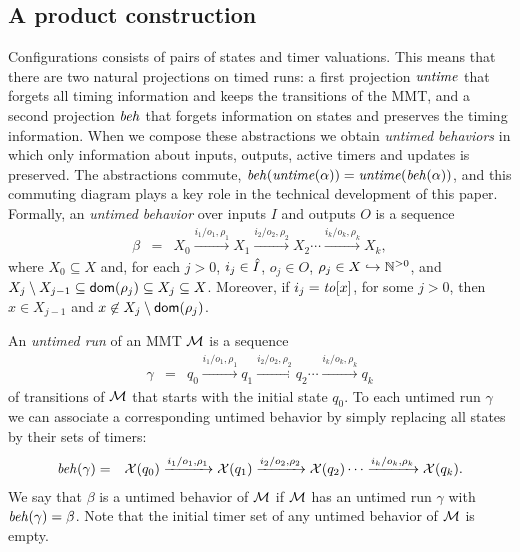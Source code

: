 \subsection{A product construction}
Configurations consists of pairs of states and timer valuations. This means that there are two natural projections on
timed runs: a first projection $\mathit{untime}$ that forgets all timing information and keeps the transitions of the MMT, 
and a second projection $\mathit{beh}$ that forgets information on states and preserves the timing information.
When we compose these abstractions we obtain \emph{untimed behaviors} in which only information about inputs, outputs,
active timers and updates is preserved.
The abstractions commute, $\mathit{beh}(\mathit{untime}(\alpha))=\mathit{untime}(\mathit{beh}(\alpha))$, and this commuting diagram plays a key role in
the technical development of this paper.
%
Formally, an \emph{untimed behavior} over inputs $I$ and outputs $O$ is a sequence 
\begin{eqnarray*}
\beta & = & X_0 \xrightarrow{i_1/o_1, \rho_1} X_1  \xrightarrow{i_2/o_2, \rho_2} X_2 \cdots \xrightarrow{i_k/o_k, \rho_k} X_{k},
\end{eqnarray*}
where $X_0 \subseteq X$ and, for each $j>0$,  $i_j \in \hat{I}$, $o_j \in O$, $\rho_j \in X \hookrightarrow {\mathbb N}^{>0}$, and
 $X_j \setminus X_{j-1}  \subseteq {\textsf{dom}}(\rho_j) \subseteq X_j \subseteq X$.
Moreover, if $i_j = \mathit{to}[x]$, for some $j>0$, then $x \in X_{j-1}$ and $x \not\in X_j \setminus {\textsf{dom}}(\rho_j)$.

An \emph{untimed run} of an MMT ${\cal M}$ is a sequence
\begin{eqnarray*}
\gamma & = & q_0 \xrightarrow{i_1/o_1, \rho_1} q_1  \xrightarrow{i_2/o_2, \rho_2} q_2 \cdots \xrightarrow{i_k/o_k, \rho_k} q_k
\end{eqnarray*}
of transitions of ${\cal M}$ that starts with the initial state $q_0$. 
To each untimed run $\gamma$ we can associate a corresponding untimed behavior by simply replacing all
states by their sets of timers:
\begin{eqnarray*}
\mathit{beh}(\gamma) & = & \mathcal{X}(q_0) \xrightarrow{i_1/o_1, \rho_1} \mathcal{X}(q_1)  \xrightarrow{i_2/o_2, \rho_2} \mathcal{X}(q_2) \cdots \xrightarrow{i_k/o_k, \rho_k} \mathcal{X}(q_k).
\end{eqnarray*}
We say that $\beta$ is a untimed behavior of ${\cal M}$ if ${\cal M}$ has an untimed run $\gamma$ with $\mathit{beh}(\gamma) = \beta$.
Note that the initial timer set of any untimed behavior of ${\cal M}$ is empty.

